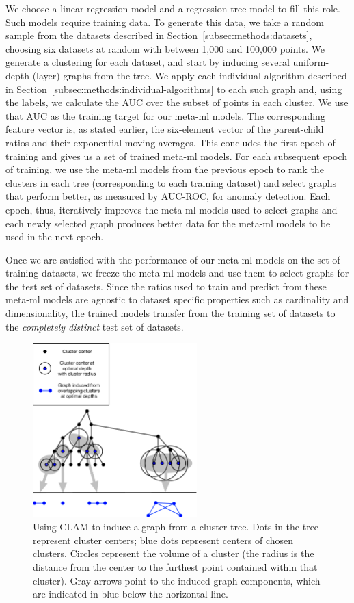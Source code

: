 We choose a linear regression model and a regression tree model to fill this role.
Such models require training data.
To generate this data, we take a random sample from the datasets described in Section~\ref{subsec:methods:datasets}, choosing six datasets at random with between 1,000 and 100,000 points.
We generate a clustering for each dataset, and start by inducing several uniform-depth (layer) graphs from the tree.
We apply each individual algorithm described in Section~\ref{subsec:methods:individual-algorithms} to each such graph and, using the labels, we calculate the AUC over the subset of points in each cluster.
We use that AUC as the training target for our meta-ml models.
The corresponding feature vector is, as stated earlier, the six-element vector of the parent-child ratios and their exponential moving averages.
This concludes the first epoch of training and gives us a set of trained meta-ml models.
For each subsequent epoch of training, we use the meta-ml models from the previous epoch to rank the clusters in each tree (corresponding to each training dataset) and select graphs that perform better, as measured by AUC-ROC, for anomaly detection.
Each epoch, thus, iteratively improves the meta-ml models used to select graphs and each newly selected graph produces better data for the meta-ml models to be used in the next epoch.

Once we are satisfied with the performance of our meta-ml models on the set of training datasets, we freeze the meta-ml models and use them to select graphs for the test set of datasets.
Since the ratios used to train and predict from these meta-ml models are agnostic to dataset specific properties such as cardinality and dimensionality, the trained models transfer from the training set of datasets to the \textit{completely distinct} test set of datasets.

\begin{figure}[ht!]
    \centering
    \includegraphics[width=2.5in]{images/tree-graph.pdf}
    \caption{Using CLAM to induce a graph from a cluster tree.
        Dots in the tree represent cluster centers;
        blue dots represent centers of chosen clusters.
        Circles represent the volume of a cluster (the radius is the distance from the center to the furthest point contained within that cluster).
        Gray arrows point to the induced graph components, which are indicated in blue below the horizontal line.}
    \label{fig:methods:graph-generation}
\end{figure}



